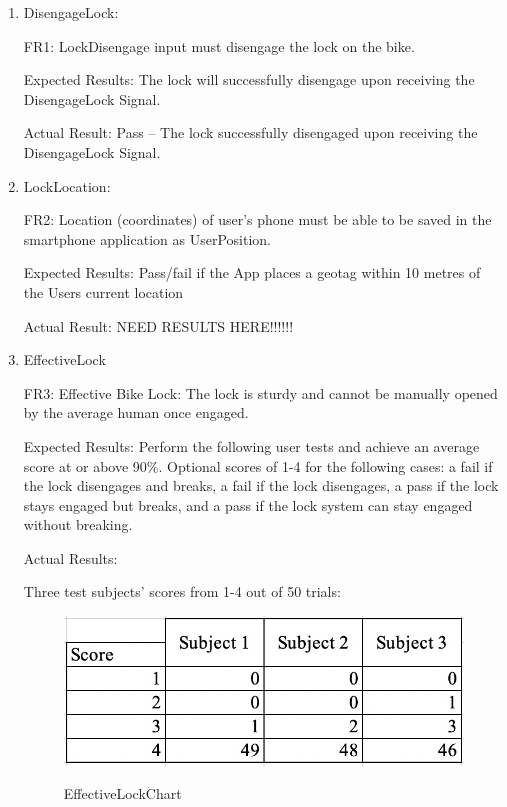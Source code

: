 \documentclass[12pt, titlepage]{article}
\begin{document}
\begin{enumerate}

\item{DisengageLock: 

FR1: LockDisengage input must disengage the lock on the bike. } 

Expected Results: The lock will successfully disengage upon receiving the DisengageLock Signal. 

Actual Result: Pass -- The lock successfully disengaged upon receiving the DisengageLock Signal. 
 
\item{LockLocation: 

FR2: Location (coordinates) of user’s phone must be able to be saved in the smartphone application as UserPosition. } 

Expected Results: Pass/fail if the App places a geotag within 10 metres of the Users current location 

Actual Result: NEED RESULTS HERE!!!!!!

\item{EffectiveLock

FR3: Effective Bike Lock: The lock is sturdy and cannot be manually opened by the average human once engaged. }

Expected Results: Perform the following user tests and achieve an average score at or above 90\%. Optional scores of 1-4 for the following cases: a fail if the lock disengages and breaks, a fail if the lock disengages, a pass if the lock stays engaged but breaks, and a pass if the lock system can stay engaged without breaking. 

Actual Results:

Three test subjects’ scores from 1-4 out of 50 trials: 
 \begin{figure}[h!]
 \begin{center}
 {
 \includegraphics[width=0.8\linewidth]{EffectiveLockChart}
 }
 \caption{\label{EffectiveLockChart} EffectiveLockChart}
 \end{center}
 \end{figure}


\end{enumerate}
\end{document}
